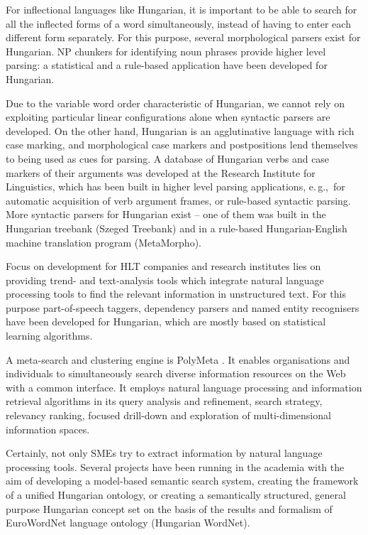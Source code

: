 \begin{multicols}{2}
For inflectional languages like Hungarian, it is important to be able to search for all the inflected forms of a word simultaneously, instead of having to enter each different form separately. For this purpose, several morphological parsers exist for Hungarian. NP chunkers for identifying noun phrases provide higher level parsing: a statistical and a rule-based application have been developed for Hungarian. 

Due to the variable word order characteristic of Hungarian, we cannot rely on exploiting particular linear configurations alone when syntactic parsers are developed. On the other hand, Hungarian is an agglutinative language with rich case marking, and morphological case markers and postpositions lend themselves to being used as cues for parsing. A database of Hungarian verbs and case markers of their arguments was developed at the Research Institute for Linguistics, which has been built in higher level parsing applications, e.\,g.,~for automatic acquisition of verb argument frames, or rule-based syntactic parsing. More syntactic parsers for Hungarian exist -- one of them was built in the Hungarian treebank (Szeged Treebank) and in a rule-based Hungarian-English machine translation program (MetaMorpho).

Focus on development for HLT companies and research institutes lies on providing trend- and text-analysis tools which integrate natural language processing tools to find the relevant information in unstructured text. For this purpose part-of-speech taggers, dependency parsers and named entity recognisers have been developed for Hungarian, which are mostly based on statistical learning algorithms.

A meta-search and clustering engine is PolyMeta \cite{polymeta}. It enables organisations and individuals to simultaneously search diverse information resources on the Web with a common interface. It employs natural language processing and information retrieval algorithms in its query analysis and refinement, search strategy, relevancy ranking, focused drill-down and exploration of multi-dimensional information spaces.

Certainly, not only SMEs try to extract information by natural language processing tools. Several projects have been running in the academia with the aim of developing a model-based semantic search system, creating the framework of a unified Hungarian ontology, or creating a semantically structured, general purpose Hungarian concept set on the basis of the results and formalism of EuroWordNet language ontology (Hungarian WordNet).


\end{multicols}
